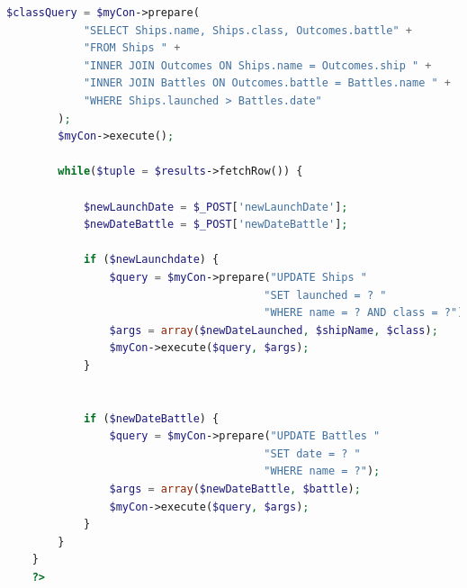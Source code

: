\documentclass[12pt]{article}
\begin{document}
\begin{enumerate}[1.]
\begin{enumerate}[a)]
\begin{lstlisting}[language=PHP]
        $classQuery = $myCon->prepare(
            "SELECT Ships.name, Ships.class, Outcomes.battle" +
            "FROM Ships " +
            "INNER JOIN Outcomes ON Ships.name = Outcomes.ship " +
            "INNER JOIN Battles ON Outcomes.battle = Battles.name " +
            "WHERE Ships.launched > Battles.date"
        );
        $myCon->execute();

        while($tuple = $results->fetchRow()) {

            $newLaunchDate = $_POST['newLaunchDate'];
            $newDateBattle = $_POST['newDateBattle'];

            if ($newLaunchdate) {
                $query = $myCon->prepare("UPDATE Ships "
                                        "SET launched = ? "
                                        "WHERE name = ? AND class = ?");
                $args = array($newDateLaunched, $shipName, $class);
                $myCon->execute($query, $args);
            }


            if ($newDateBattle) {
                $query = $myCon->prepare("UPDATE Battles "
                                        "SET date = ? "
                                        "WHERE name = ?");
                $args = array($newDateBattle, $battle);
                $myCon->execute($query, $args);
            }
        }
    }
    ?>
    \end{lstlisting}

    \end{enumerate}

\end{enumerate}
\end{document}

